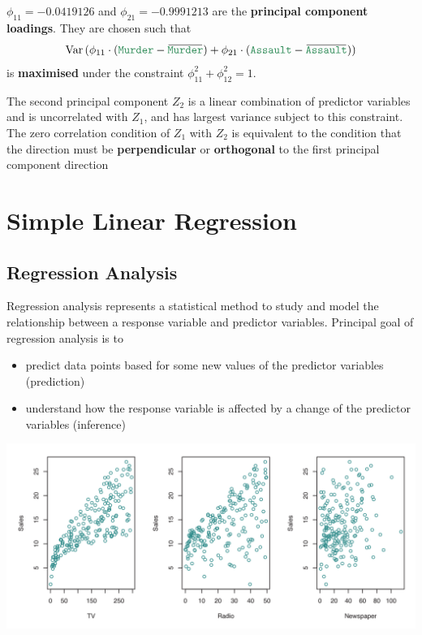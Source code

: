 \documentclass[11pt]{article}
\theoremstyle{definition}
\newcommand*\Var[1]{\mathop{\text{Var}}\left(#1\right)}
\newcommand*\predvar[1]{{\color{SeaGreen4} \texttt{#1}}}
\newcommand{\overbar}[1]{\mkern 1.5mu\overline{\mkern-1.5mu#1\mkern-1.5mu}\mkern 1.5mu}
\begin{document}
$\phi_{11} = -0.0419126$ and $\phi_{21} = -0.9991213$ are the \textbf{principal component loadings}. They are chosen such that
\begin{equation*}
\Var{\phi_{11}\cdot(\text{\predvar{Murder}} - \overbar{\text{\predvar{Murder}}}) + \phi_{21}\cdot(\text{\predvar{Assault}} - \overbar{\text{\predvar{Assault}}})}
\end{equation*}
is \textbf{maximised} under the constraint $\phi_{11}^2 + \phi_{12}^2 = 1$.

The second principal component $Z_2$ is a linear combination of predictor variables and is uncorrelated with $Z_1$, and has largest variance subject to this constraint. The zero correlation condition of $Z_1$ with $Z_2$ is equivalent to the condition that the direction must be \textbf{perpendicular} or \textbf{orthogonal} to the first principal component direction

\section{Simple Linear Regression}
\subsection{Regression Analysis}
Regression analysis represents a statistical method to study and model the relationship between a response variable and predictor variables. Principal goal of regression analysis is to
\begin{itemize}[noitemsep]
	\item predict data points based for some new values of the predictor variables (prediction)
	\item understand how the response variable is affected by a change of the predictor variables (inference)
\end{itemize}

\begin{center}
	\includegraphics[width=0.8\linewidth]{img/sales_advertising}
\end{center}
\end{document}
